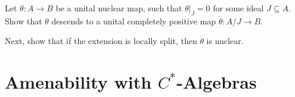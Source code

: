\documentclass[10pt]{mypackage}
\begin{document}
\begin{exercise}[Exercise 2.1.9]
  Let $\theta\colon A\rightarrow B$ be a unital nuclear map, such that $\theta|_{J} = 0$ for some ideal $J\subseteq A$. Show that $\theta$ descends to a unital completely positive map $\dot{\theta}\colon A/J\rightarrow B$.\newline

  Next, show that if the extension is locally split, then $\dot{\theta}$ is nuclear.
  \begin{center}
  \end{center}
\end{exercise}

\section{Amenability with \texorpdfstring{$C^{\ast}$-Algebras}{C*-Algebras}}%
\end{document}
